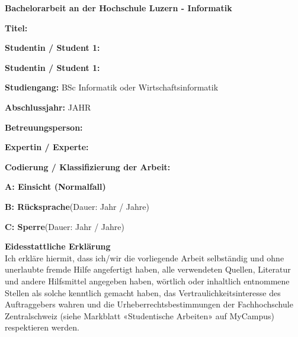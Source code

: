 \noindent
\textbf{\Large{Bachelorarbeit an der Hochschule Luzern - Informatik}}

\vspace{0.6cm}
\noindent
\textbf{Titel:}

\vspace{0.6cm}
\noindent
\textbf{Studentin / Student 1:}

\vspace{0.6cm}
\noindent
\textbf{Studentin / Student 1:}

\vspace{1cm}
\noindent
\textbf{Studiengang:} BSc Informatik oder Wirtschaftsinformatik

\vspace{0.6cm}
\noindent
\textbf{Abschlussjahr:} JAHR

\vspace{0.6cm}
\noindent
\textbf{Betreuungsperson:}

\vspace{0.6cm}
\noindent
\textbf{Expertin / Experte:}

\vspace{0.6cm}
\noindent
\textbf{Codierung / Klassifizierung der Arbeit:}

\begin{todolist}
	\item \textbf{A: Einsicht (Normalfall)}
	\item \textbf{B: Rücksprache}\hspace*{0.7cm}(Dauer:\hspace*{1cm} Jahr / Jahre)
	\item \textbf{C: Sperre}\hspace*{1.865cm}(Dauer:\hspace*{1cm} Jahr / Jahre)
\end{todolist}

\vfill

\noindent
\textbf{Eidesstattliche Erklärung}
\\
Ich erkläre hiermit, dass ich/wir die vorliegende Arbeit selbständig und ohne unerlaubte fremde Hilfe angefertigt haben, alle verwendeten Quellen, Literatur und andere Hilfsmittel angegeben haben, wörtlich oder inhaltlich entnommene Stellen als solche kenntlich gemacht haben, das Vertraulichkeitsinteresse des Auftraggebers wahren und die Urheberrechtsbestimmungen der Fachhochschule Zentralschweiz (siehe Markblatt «Studentische Arbeiten» auf MyCampus) respektieren werden.

\vspace{1em}

